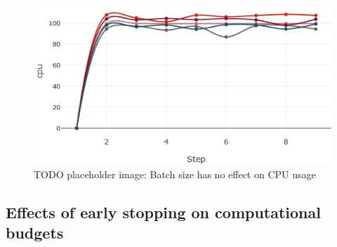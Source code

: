 



\begin{figure}[h]
    \includegraphics[width=12cm]{assets/batch_size_vs_cpu.png}
    \caption{TODO placeholder image: Batch size has no effect on CPU usage}
    \label{figure:batchvscpu}
\end{figure}

\subsection{Effects of early stopping on computational budgets}


